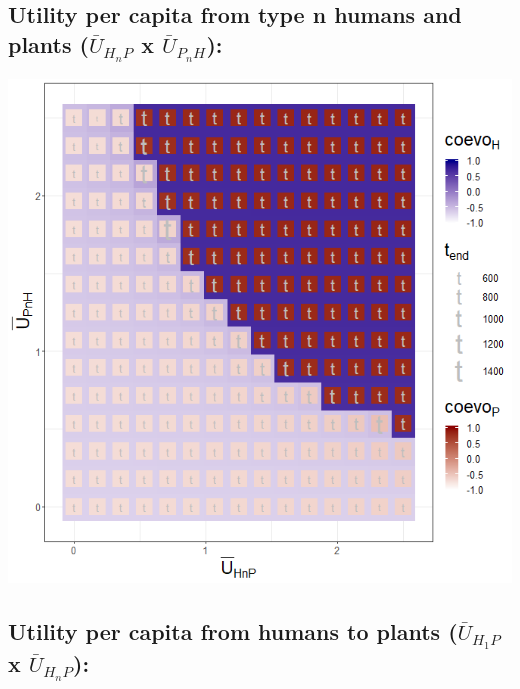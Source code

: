 \documentclass[]{book}
\begin{document}
\newpage

\hypertarget{utility-per-capita-from-type-n-humans-and-plants-baru_h_np-x-baru_p_nh-1}{%
\subsection{\texorpdfstring{Utility per capita from type n humans and plants (\(\bar{U}_{H_{n}P}\) x \(\bar{U}_{P_{n}H}\)):}{Utility per capita from type n humans and plants (\textbackslash{}bar\{U\}\_\{H\_\{n\}P\} x \textbackslash{}bar\{U\}\_\{P\_\{n\}H\}):}}\label{utility-per-capita-from-type-n-humans-and-plants-baru_h_np-x-baru_p_nh-1}}

\includegraphics[width=1\linewidth]{plots/3_twoPar-mU.HnP-mU.PnH_plot}

\newpage

\hypertarget{utility-per-capita-from-humans-to-plants-baru_h_1p-x-baru_h_np}{%
\subsection{\texorpdfstring{Utility per capita from humans to plants (\(\bar{U}_{H_{1}P}\) x \(\bar{U}_{H_{n}P}\)):}{Utility per capita from humans to plants (\textbackslash{}bar\{U\}\_\{H\_\{1\}P\} x \textbackslash{}bar\{U\}\_\{H\_\{n\}P\}):}}\label{utility-per-capita-from-humans-to-plants-baru_h_1p-x-baru_h_np}}
\end{document}
